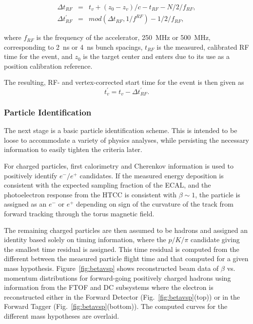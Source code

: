 \begin{eqnarray*}
\Delta t_{RF} &=& t_v + (z_0-z_v)/c - t_{RF} - N/2/f_{RF}, \\
\Delta t^{\prime}_{RF} &=& mod(\Delta t_{RF},1/f^{RF})-1/2/f_{RF},
\end{eqnarray*}

\noindent
where $f_{RF}$ is the frequency of the accelerator, 250~MHz or 500~MHz, corresponding to 2~ns or 4~ns bunch
spacings, $t_{RF}$ is the measured, calibrated RF time for the event, and $z_0$ is the target center and enters
due to its use as a position calibration reference.

The resulting, RF- and vertex-corrected start time for the event is then given as
\begin{equation}\label{eq:starttime}
t^{\prime}_v = t_v - \Delta t^{\prime}_{RF}.
\end{equation}

\subsubsection{Particle Identification}

The next stage is a basic particle identification scheme.  This is intended to be loose to accommodate a variety of
physics analyses, while persisting the necessary information to easily tighten the criteria later.

For charged particles, first calorimetry and Cherenkov information is used to positively identify $e^-/e^+$
candidates. If the measured energy deposition is consistent with the expected sampling fraction of the ECAL,
and the photoelectron response from the HTCC is consistent with $\beta\sim1$, the particle is assigned as an
$e^-$ or $e^+$ depending on sign of the curvature of the track from forward tracking through the torus
magnetic field.

The remaining charged particles are then assumed to be hadrons and assigned an identity based solely on timing
information, where the $p/K/\pi$ candidate giving the smallest time residual is assigned. This time residual is
computed from the different between the measured particle flight time and that computed for a given mass
hypothesis. Figure~\ref{fig:betavsp} shows reconstructed beam data of $\beta$ vs. momentum distributions
for forward-going positively charged hadrons using information from the FTOF and DC subsystems where the
electron is reconstructed either in the Forward Detector (Fig.~\ref{fig:betavsp}(top)) or in the Forward Tagger
(Fig.~\ref{fig:betavsp}(bottom)). The computed curves for the different mass hypotheses are overlaid.

